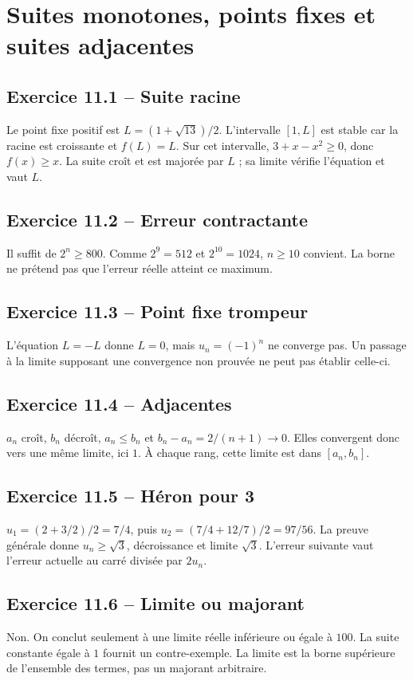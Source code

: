 \chapter{Suites monotones, points fixes et suites adjacentes}
\section*{Exercice 11.1 -- Suite racine}
Le point fixe positif est $L=(1+\sqrt{13})/2$. L'intervalle $[1,L]$ est stable car la racine est croissante et $f(L)=L$. Sur cet intervalle, $3+x-x^2\ge0$, donc $f(x)\ge x$. La suite croît et est majorée par $L$ ; sa limite vérifie l'équation et vaut $L$.

\section*{Exercice 11.2 -- Erreur contractante}
Il suffit de $2^n\ge800$. Comme $2^9=512$ et $2^{10}=1024$, $n\ge10$ convient. La borne ne prétend pas que l'erreur réelle atteint ce maximum.

\section*{Exercice 11.3 -- Point fixe trompeur}
L'équation $L=-L$ donne $L=0$, mais $u_n=(-1)^n$ ne converge pas. Un passage à la limite supposant une convergence non prouvée ne peut pas établir celle-ci.

\section*{Exercice 11.4 -- Adjacentes}
$a_n$ croît, $b_n$ décroît, $a_n\le b_n$ et $b_n-a_n=2/(n+1)\to0$. Elles convergent donc vers une même limite, ici $1$. À chaque rang, cette limite est dans $[a_n,b_n]$.

\section*{Exercice 11.5 -- Héron pour 3}
$u_1=(2+3/2)/2=7/4$, puis $u_2=(7/4+12/7)/2=97/56$. La preuve générale donne $u_n\ge\sqrt3$, décroissance et limite $\sqrt3$. L'erreur suivante vaut l'erreur actuelle au carré divisée par $2u_n$.

\section*{Exercice 11.6 -- Limite ou majorant}
Non. On conclut seulement à une limite réelle inférieure ou égale à $100$. La suite constante égale à $1$ fournit un contre-exemple. La limite est la borne supérieure de l'ensemble des termes, pas un majorant arbitraire.
